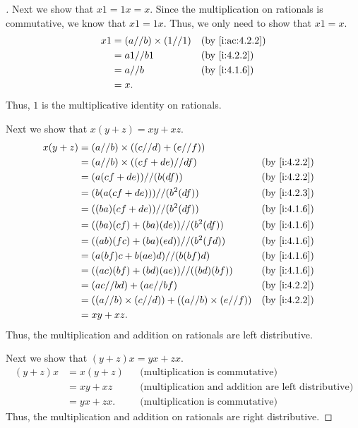 \begin{proof}[]
  Next we show that \(x1 = 1x = x\).
  Since the multiplication on rationals is commutative, we know that \(x1 = 1x\).
  Thus, we only need to show that \(x1 = x\).
  \begin{align*}
    x1 & = (a // b) \times (1 // 1) &  & \by{i:ac:4.2.2} \\
       & = a1 // b1                 &  & \by{i:4.2.2}    \\
       & = a // b                   &  & \by{i:4.1.6}    \\
       & = x.
  \end{align*}
  Thus, \(1\) is the multiplicative identity on rationals.

  Next we show that \(x(y + z) = xy + xz\).
  \begin{align*}
    x(y + z) & = (a // b) \times ((c // d) + (e // f))                                     \\
             & = (a // b) \times ((cf + de) // df)                       &  & \by{i:4.2.2} \\
             & = (a(cf + de)) // (b(df))                                 &  & \by{i:4.2.2} \\
             & = (b(a(cf + de))) // (b^2(df))                            &  & \by{i:4.2.3} \\
             & = ((ba)(cf + de)) // (b^2(df))                            &  & \by{i:4.1.6} \\
             & = ((ba)(cf) + (ba)(de)) // (b^2(df))                      &  & \by{i:4.1.6} \\
             & = ((ab)(fc) + (ba)(ed)) // (b^2(fd))                      &  & \by{i:4.1.6} \\
             & = (a(bf)c + b(ae)d) // (b(bf)d)                           &  & \by{i:4.1.6} \\
             & = ((ac)(bf) + (bd)(ae)) // ((bd)(bf))                     &  & \by{i:4.1.6} \\
             & = (ac // bd) + (ae // bf)                                 &  & \by{i:4.2.2} \\
             & = ((a // b) \times (c // d)) + ((a // b) \times (e // f)) &  & \by{i:4.2.2} \\
             & = xy + xz.
  \end{align*}
  Thus, the multiplication and addition on rationals are left distributive.

  Next we show that \((y + z)x = yx + zx\).
  \begin{align*}
    (y + z)x & = x(y + z) &  & \text{(multiplication is commutative)}                     \\
             & = xy + xz  &  & \text{(multiplication and addition are left distributive)} \\
             & = yx + zx. &  & \text{(multiplication is commutative)}
  \end{align*}
  Thus, the multiplication and addition on rationals are right distributive.


\end{proof}
